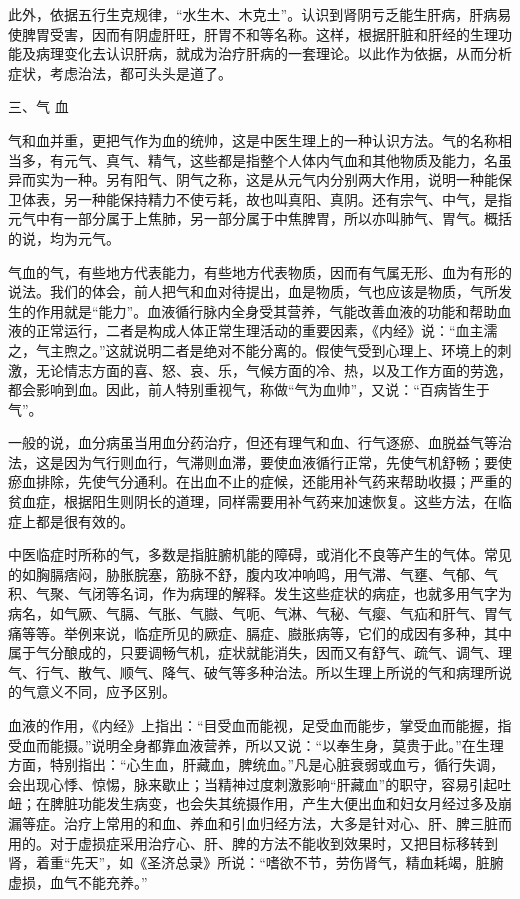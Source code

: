 \documentclass[12pt,UTF8]{ctexbook}
\begin{document}
此外，依据五行生克规律，“水生木、木克土”。认识到肾阴亏乏能生肝病，肝病易使脾胃受害，因而有阴虚肝旺，肝胃不和等名称。这样，根据肝脏和肝经的生理功能及病理变化去认识肝病，就成为治疗肝病的一套理论。以此作为依据，从而分析症状，考虑治法，都可头头是道了。

三、气 血

气和血并重，更把气作为血的统帅，这是中医生理上的一种认识方法。气的名称相当多，有元气、真气、精气，这些都是指整个人体内气血和其他物质及能力，名虽异而实为一种。另有阳气、阴气之称，这是从元气内分别两大作用，说明一种能保卫体表，另一种能保持精力不使亏耗，故也叫真阳、真阴。还有宗气、中气，是指元气中有一部分属于上焦肺，另一部分属于中焦脾胃，所以亦叫肺气、胃气。概括的说，均为元气。

气血的气，有些地方代表能力，有些地方代表物质，因而有气属无形、血为有形的说法。我们的体会，前人把气和血对待提出，血是物质，气也应该是物质，气所发生的作用就是“能力”。血液循行脉内全身受其营养，气能改善血液的功能和帮助血液的正常运行，二者是构成人体正常生理活动的重要因素，《内经》说：“血主濡之，气主煦之。”这就说明二者是绝对不能分离的。假使气受到心理上、环境上的刺激，无论情志方面的喜、怒、哀、乐，气候方面的冷、热，以及工作方面的劳逸，都会影响到血。因此，前人特别重视气，称做“气为血帅”，又说：“百病皆生于气”。

一般的说，血分病虽当用血分药治疗，但还有理气和血、行气逐瘀、血脱益气等治法，这是因为气行则血行，气滞则血滞，要使血液循行正常，先使气机舒畅；要使瘀血排除，先使气分通利。在出血不止的症候，还能用补气药来帮助收摄；严重的贫血症，根据阳生则阴长的道理，同样需要用补气药来加速恢复。这些方法，在临症上都是很有效的。

中医临症时所称的气，多数是指脏腑机能的障碍，或消化不良等产生的气体。常见的如胸膈痞闷，胁胀脘塞，筋脉不舒，腹内攻冲响鸣，用气滞、气壅、气郁、气积、气聚、气闭等名词，作为病理的解释。发生这些症状的病症，也就多用气字为病名，如气厥、气膈、气胀、气臌、气呃、气淋、气秘、气瘿、气疝和肝气、胃气痛等等。举例来说，临症所见的厥症、膈症、臌胀病等，它们的成因有多种，其中属于气分酿成的，只要调畅气机，症状就能消失，因而又有舒气、疏气、调气、理气、行气、散气、顺气、降气、破气等多种治法。所以生理上所说的气和病理所说的气意义不同，应予区别。

血液的作用，《内经》上指出：“目受血而能视，足受血而能步，掌受血而能握，指受血而能摄。”说明全身都靠血液营养，所以又说：“以奉生身，莫贵于此。”在生理方面，特别指出：“心生血，肝藏血，脾统血。”凡是心脏衰弱或血亏，循行失调，会出现心悸、惊惕，脉来歇止；当精神过度刺激影响“肝藏血”的职守，容易引起吐衄；在脾脏功能发生病变，也会失其统摄作用，产生大便出血和妇女月经过多及崩漏等症。治疗上常用的和血、养血和引血归经方法，大多是针对心、肝、脾三脏而用的。对于虚损症采用治疗心、肝、脾的方法不能收到效果时，又把目标移转到肾，着重“先天”，如《圣济总录》所说：“嗜欲不节，劳伤肾气，精血耗竭，脏腑虚损，血气不能充养。”
\end{document}
